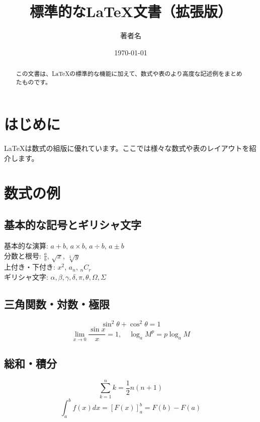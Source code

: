 \documentclass{ltjsarticle}
\title{標準的なLaTeX文書（拡張版）}
\author{著者名}
\date{\today}
\theoremstyle{definition}
\begin{document}
\maketitle
\tableofcontents
\newpage

\begin{abstract}
この文書は、LaTeXの標準的な機能に加えて、数式や表のより高度な記述例をまとめたものです。
\end{abstract}

\section{はじめに}
LaTeXは数式の組版に優れています。ここでは様々な数式や表のレイアウトを紹介します。

\section{数式の例}

\subsection{基本的な記号とギリシャ文字}
基本的な演算: $a + b$, $a \times b$, $a \div b$, $a \pm b$\\
分数と根号: $\frac{a}{b}$, $\sqrt{x}$, $\sqrt[3]{y}$\\
上付き・下付き: $x^2$, $a_n$, ${}_{n}C_{r}$\\
ギリシャ文字: $\alpha, \beta, \gamma, \delta, \pi, \theta, \Omega, \Sigma$

\subsection{三角関数・対数・極限}
\begin{equation}
  \sin^2 \theta + \cos^2 \theta = 1
\end{equation}
\begin{equation}
  \lim_{x \to 0} \frac{\sin x}{x} = 1, \quad \log_a M^p = p \log_a M
\end{equation}

\subsection{総和・積分}
\begin{equation}
  \sum_{k=1}^{n} k = \frac{1}{2}n(n+1)
\end{equation}
\begin{equation}
  \int_{a}^{b} f(x) dx = \left[ F(x) \right]_{a}^{b} = F(b) - F(a)
\end{equation}
\end{document}
